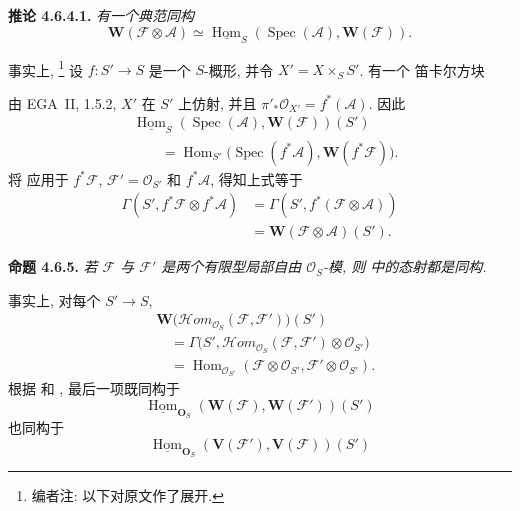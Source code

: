 \medskip
\noindent{}\textbf{推论 4.6.4.1.}
\textit{有一个典范同构
\[
  \mathbf W(\mathscr F\otimes\mathscr A)
    \simeq
  \underline{\operatorname{Hom}}_S
    (\operatorname{Spec}(\mathscr A),\mathbf W(\mathscr F)).
\]}

事实上,
\footnote{编者注: 以下对原文作了展开.}
设 \(f:S'\to S\) 是一个 \(S\)-概形, 并令 \(X'=X\times_S S'\).
有一个 笛卡尔方块

\begin{figure}[H]
  \centering
  
  \label{fig:sga3-exp1-p027-cor4641-cartesian-square}
\end{figure}

由 EGA~II, 1.5.2, \(X'\) 在 \(S'\) 上仿射, 并且
\(\pi'_*\mathcal O_{X'}=f^*(\mathscr A)\). 因此
\begin{align*}
  &\underline{\operatorname{Hom}}_S
     (\operatorname{Spec}(\mathscr A),\mathbf W(\mathscr F))(S')\\
  &\qquad=
  \operatorname{Hom}_{S'}
     \bigl(\operatorname{Spec}(f^*\mathscr A),
           \mathbf W(f^*\mathscr F)\bigr).
\end{align*}
将  应用于
\(f^*\mathscr F\), \(\mathscr F'=\mathcal O_{S'}\) 和
\(f^*\mathscr A\), 得知上式等于
\begin{align*}
  \Gamma(S',f^*\mathscr F\otimes f^*\mathscr A)
    &=\Gamma(S',f^*(\mathscr F\otimes\mathscr A))\\
    &=\mathbf W(\mathscr F\otimes\mathscr A)(S').
\end{align*}

\medskip
\noindent{}\textbf{命题 4.6.5.}
\textit{若 \(\mathscr F\) 与 \(\mathscr F'\) 是两个有限型局部自由
\(\mathcal O_S\)-模, 则 
中的态射都是同构.}

事实上, 对每个 \(S'\to S\),
\begin{align*}
  &\mathbf W
    \bigl(\mathscr{H}om_{\mathcal O_S}(\mathscr F,\mathscr F')\bigr)(S')\\
  &\quad=
    \Gamma\bigl(S',
      \mathscr{H}om_{\mathcal O_S}(\mathscr F,\mathscr F')
        \otimes\mathcal O_{S'}\bigr)\\
  &\quad=
    \operatorname{Hom}_{\mathcal O_{S'}}
      (\mathscr F\otimes\mathcal O_{S'},
       \mathscr F'\otimes\mathcal O_{S'}).
\end{align*}
根据  和
, 最后一项既同构于
\[
  \underline{\operatorname{Hom}}_{\mathbf O_S}
    (\mathbf W(\mathscr F),\mathbf W(\mathscr F'))(S')
\]
也同构于
\[
  \underline{\operatorname{Hom}}_{\mathbf O_S}
    (\mathbf V(\mathscr F'),\mathbf V(\mathscr F))(S')
\]

